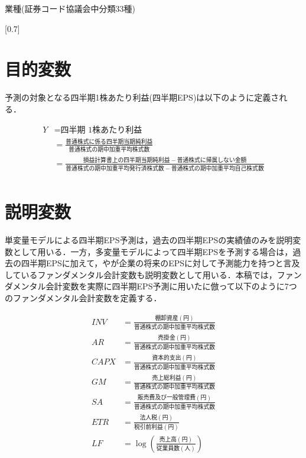 \documentclass[a4paper，12pt]{jsarticle}
\begin{document}
\begin{table}
  \centering
  \caption{業種(証券コード協議会中分類33種)}
  \label{tab:ind}
  \scalebox{0.7}[0.7]{
    
  }
\end{table}

\section{目的変数}

予測の対象となる四半期1株あたり利益(四半期EPS)は以下のように定義される．

\begin{equation}
  \begin{split}
    Y &= \text{四半期 1株あたり利益} \\
    &= \frac{普通株式に係る四半期当期純利益}{普通株式の期中加重平均株式数} \\
    &= \frac{損益計算書上の四半期当期純利益-普通株式に帰属しない金額}{普通株式の期中加重平均発行済株式数 - 普通株式の期中加重平均自己株式数} \\  
  \end{split}
\end{equation}

\section{説明変数}

単変量モデルによる四半期EPS予測は，過去の四半期EPSの実績値のみを説明変数として用いる．一方，多変量モデルによって四半期EPSを予測する場合は，過去の四半期EPSに加えて，\cite{lev1993fundamental}や\cite{abarbanell1997fundamental}が企業の将来のEPSに対して予測能力を持つと言及しているファンダメンタル会計変数も説明変数として用いる．本稿では，ファンダメンタル会計変数を実際に四半期EPS予測に用いた\cite{zhang2004neural}に倣って以下のように7つのファンダメンタル会計変数を定義する．

\begin{equation}
  \begin{split}
    INV &= \frac{棚卸資産(円)}{普通株式の期中加重平均株式数} \\
    AR &= \frac{売掛金(円)}{普通株式の期中加重平均株式数} \\
    CAPX &= \frac{資本的支出(円)}{普通株式の期中加重平均株式数} \\
    GM &= \frac{売上総利益(円)}{普通株式の期中加重平均株式数} \\
    SA &= \frac{販売費及び一般管理費(円)}{普通株式の期中加重平均株式数} \\
    ETR &= \frac{法人税(円)}{税引前利益(円)} \\
    LF &= \log{\left(\frac{売上高(円)}{従業員数(人)}\right)} \\
  \end{split}
\end{equation}
\end{document}
